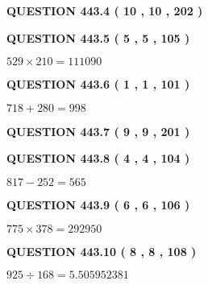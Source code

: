 \documentclass{ctexart}
\begin{document}
{\textbf{\Large{QUESTION
443.4 
 ( 10 , 10 , 202 )
}}}
  
  
  
\vspace{0.2in}
  
{\textbf{\Large{QUESTION
443.5 
 ( 5 , 5 , 105 )
}}}
  
  
 
 

$ %
529 \times  %
210=   %
111090$
 
 
  
\vspace{0.2in}
  
{\textbf{\Large{QUESTION
443.6 
 ( 1 , 1 , 101 )
}}}
  
  
 
 

$ %
718 +  %
280=   %
998$
 
 
  
\vspace{0.2in}
  
{\textbf{\Large{QUESTION
443.7 
 ( 9 , 9 , 201 )
}}}
  
  
  
\vspace{0.2in}
  
{\textbf{\Large{QUESTION
443.8 
 ( 4 , 4 , 104 )
}}}
  
  
 
 

$ %
817 -  %
252=   %
565$
 
 
  
\vspace{0.2in}
  
{\textbf{\Large{QUESTION
443.9 
 ( 6 , 6 , 106 )
}}}
  
  
 
 

$ %
775 \times  %
378=   %
292950$
 
 
  
\vspace{0.2in}
  
{\textbf{\Large{QUESTION
443.10 
 ( 8 , 8 , 108 )
}}}
  
  
 
 

$ %
925 \div  %
168=   %
5.505952381$
 
 
   
   
 \vspace{0.2in}
 
   
   
   
   
\end{document}
